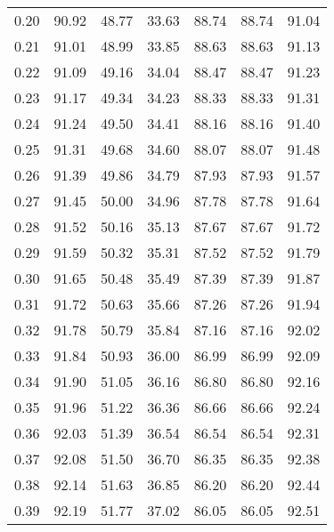\begin{tabular}{|c|c|c|c|c|c|c|}
      0.20 &     90.92 &     48.77 &      33.63 &   88.74 &      88.74 &         91.04 \\
      0.21 &     91.01 &     48.99 &      33.85 &   88.63 &      88.63 &         91.13 \\
      0.22 &     91.09 &     49.16 &      34.04 &   88.47 &      88.47 &         91.23 \\
      0.23 &     91.17 &     49.34 &      34.23 &   88.33 &      88.33 &         91.31 \\
      0.24 &     91.24 &     49.50 &      34.41 &   88.16 &      88.16 &         91.40 \\
      0.25 &     91.31 &     49.68 &      34.60 &   88.07 &      88.07 &         91.48 \\
      0.26 &     91.39 &     49.86 &      34.79 &   87.93 &      87.93 &         91.57 \\
      0.27 &     91.45 &     50.00 &      34.96 &   87.78 &      87.78 &         91.64 \\
      0.28 &     91.52 &     50.16 &      35.13 &   87.67 &      87.67 &         91.72 \\
      0.29 &     91.59 &     50.32 &      35.31 &   87.52 &      87.52 &         91.79 \\
      0.30 &     91.65 &     50.48 &      35.49 &   87.39 &      87.39 &         91.87 \\
      0.31 &     91.72 &     50.63 &      35.66 &   87.26 &      87.26 &         91.94 \\
      0.32 &     91.78 &     50.79 &      35.84 &   87.16 &      87.16 &         92.02 \\
      0.33 &     91.84 &     50.93 &      36.00 &   86.99 &      86.99 &         92.09 \\
      0.34 &     91.90 &     51.05 &      36.16 &   86.80 &      86.80 &         92.16 \\
      0.35 &     91.96 &     51.22 &      36.36 &   86.66 &      86.66 &         92.24 \\
      0.36 &     92.03 &     51.39 &      36.54 &   86.54 &      86.54 &         92.31 \\
      0.37 &     92.08 &     51.50 &      36.70 &   86.35 &      86.35 &         92.38 \\
      0.38 &     92.14 &     51.63 &      36.85 &   86.20 &      86.20 &         92.44 \\
      0.39 &     92.19 &     51.77 &      37.02 &   86.05 &      86.05 &         92.51 \\

\end{tabular}
